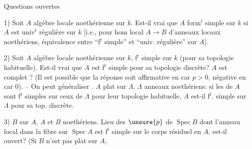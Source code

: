 
Questions ouvertes

1) Soit $A$ algèbre locale noethérienne sur $k$. Est-il vrai
que $A$ form$^t$ simple sur $k$ si $A$ est univ$^t$ régulière
sur $k$ [i.e., pour hom local $A\longrightarrow B$ d'anneaux
locaux noethériens, équivalence entre ``f$^t$ simple''
et ``univ. régulière''  sur $A$].


2) Soit $A$ algèbre locale noethérienne sur $k$, f$^t$
simple sur $k$ (pour sa topologie habituelle).
Est-il vrai que $A$ est f$^t$ simple pour sa topologie
discrète?  $A$ est complet ? (Il est
possible que la réponse soit affirmative en
car $p>0$, négative en car 0). -- On peut
généraliser . $A$ plat sur $\Lambda$,
 $\Lambda$ anneaux noethériens: si les
 de $A$ sont f$^t$ simples sur ceux de $\Lambda$
pour leur topologie habituelle, $A$ est-il f$^t$.
simple sur $\Lambda$ pour sa top. discrète.


3) $B$   sur $A$, $A$ et $B$ noethériens.
Lieu des $\unsure{p}$ de $\operatorname{Spec}B$ dont l'anneau
local dans la fibre sur $\operatorname{Spec}A$ est f$^t$ simple
sur le corps résiduel en $A$, est-il ouvert?
\deleted{[NB. \unsure{Même}} (Si $B$ n'est pas plat sur $A$,

